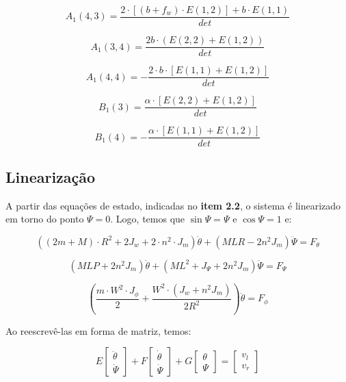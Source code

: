 \documentclass[12pt]{article}
\begin{document}
\begin{equation}
    A_1(4,3) = \frac{2 \cdot [(b + f_w)\cdot E(1,2)]+ b\cdot E(1,1)}{det} 
\end{equation}

\begin{equation}
    A_1(3,4) = \frac{2b \cdot (E(2,2) + E(1,2))}{det}
\end{equation}

\begin{equation}
    A_1(4,4) = -\frac{2 \cdot b \cdot [E(1,1) + E(1,2)]}{det}
\end{equation}

\begin{equation}
    B_1(3) = \frac{\alpha \cdot [E(2,2) + E(1,2)]}{det}
\end{equation}

\begin{equation}
    B_1(4) = -\frac{\alpha \cdot [E(1,1) + E(1,2)]}{det}
\end{equation}

\subsection{Linearização}

\quad A partir das equações de estado, indicadas no \textbf{item 2.2}, o sistema é linearizado em torno do ponto $\Psi = 0$. Logo, temos que $\sin{\Psi} = \Psi$ e $\cos{\Psi} = 1$ e:

\begin{equation}
    \left((2m + M) \cdot R^2 + 2J_w + 2 \cdot n^2 \cdot J_m\right)\ddot{\theta} + (MLR - 2n^2 J_m)\ddot{\Psi} = F_{\theta}
\end{equation}

\begin{equation}
    (MLP + 2n^2J_m)\ddot{\theta} + (ML^2 + J_{\Psi} + 2n^2J_m)\ddot{\Psi} = F_{\Psi}
\end{equation}

\begin{equation}
    \left(\frac{m \cdot W^2 \cdot J_{\phi}}{2}  + \frac{W^2 \cdot (J_w + n^2J_m)}{2R^2}\right)\ddot{\theta} = F_{\phi}
\end{equation}

Ao reescrevê-las em forma de matriz, temos:

\begin{equation*}
    E \begin{bmatrix}
      \ddot{\theta} \\
      \dot{\Psi}
    \end{bmatrix}+
    F \begin{bmatrix}
      \dot{\theta}\\
      \dot{\Psi}
    \end{bmatrix}+
    G \begin{bmatrix}
      \theta\\
      \Psi
    \end{bmatrix} = 
    \begin{bmatrix}
      v_l\\
      v_r
    \end{bmatrix}
\end{equation*}
\end{document}

